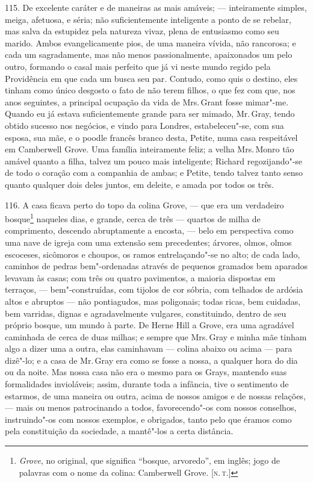 115. De excelente caráter e de maneiras as mais amáveis; --- inteiramente
simples, meiga, afetuosa, e séria; não suficientemente inteligente a
ponto de se rebelar, mas salva da estupidez pela natureza vivaz, plena
de entusiasmo como seu marido. Ambos evangelicamente pios, de uma
maneira vívida, não rancorosa; e cada um sagradamente, mas não menos
passionalmente, apaixonados um pelo outro, formando o casal mais
perfeito que já vi neste mundo regido pela Providência em que cada um
busca seu par. Contudo, como quis o destino, eles tinham como único
desgosto o fato de não terem filhos, o que fez com que, nos anos
seguintes, a principal ocupação da vida de Mrs.\,Grant fosse
mimar"-me. Quando eu já estava suficientemente grande para ser
mimado, Mr.\,Gray, tendo obtido sucesso nos negócios, e vindo para
Londres, estabeleceu"-se, com sua esposa, sua mãe, e o poodle francês
branco desta, Petite, numa casa respeitável em Camberwell Grove. Uma
família inteiramente feliz; a velha Mrs.\,Monro tão amável quanto a filha,
talvez um pouco mais inteligente; Richard regozijando"-se de todo o
coração com a companhia de ambas; e Petite, tendo talvez tanto senso
quanto qualquer dois deles juntos, em deleite, e amada por todos os
três.

116. A casa ficava perto do topo da colina Grove, --- que era um
verdadeiro bosque\footnote{\emph{Grove}, no original, que significa
  ``bosque, arvoredo'', em inglês; jogo de palavras com o nome da
  colina: Camberwell Grove. {[}\textsc{n.\,t.}{]}} naqueles dias, e grande,
cerca de três --- quartos de milha de comprimento, descendo abruptamente
a encosta, --- belo em perspectiva como uma nave de igreja com uma
extensão sem precedentes; árvores, olmos, olmos escoceses, sicômoros e
choupos, os ramos entrelaçando"-se no alto; de cada lado, caminhos de
pedras bem"-ordenadas através de pequenos gramados bem aparados levavam
às casas; com três ou quatro pavimentos, a maioria dispostas em
terraços, --- bem"-construídas, com tijolos de cor sóbria, com telhados de
ardósia altos e abruptos --- não pontiagudos, mas poligonais; todas
ricas, bem cuidadas, bem varridas, dignas e agradavelmente vulgares,
constituindo, dentro de seu próprio bosque, um mundo à parte. De Herne
Hill a Grove, era uma agradável caminhada de cerca de duas milhas; e
sempre que Mrs.\,Gray e minha mãe tinham algo a dizer uma a outra, elas
caminhavam --- colina abaixo ou acima --- para dizê"-lo; e a casa de Mr.\,Gray era como se fosse a nossa, a qualquer hora do dia ou da noite. Mas
nossa casa não era o mesmo para os Grays, mantendo suas formalidades
invioláveis; assim, durante toda a infância, tive o sentimento de
estarmos, de uma maneira ou outra, acima de nossos amigos e de nossas
relações, --- mais ou menos patrocinando a todos, favorecendo"-os com
nossos conselhos, instruindo"-os com nossos exemplos, e obrigados, tanto
pelo que éramos como pela constituição da sociedade, a mantê"-los a certa
distância.

